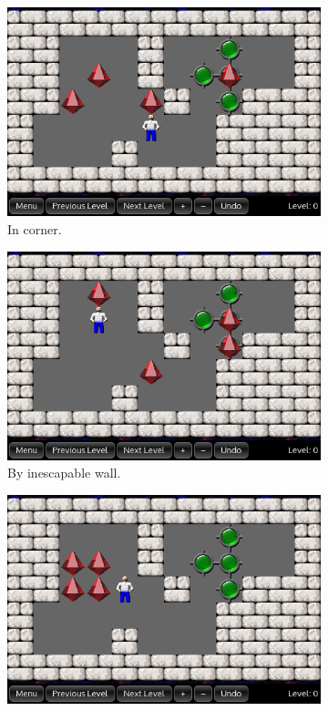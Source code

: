 \begin{figure}[h]
\centering
\begin{subfigure}{0.3\textwidth}
  \centering
  \includegraphics[width=\linewidth]{img/deadlock_corner}
  \caption{In corner.}
  \label{fig:deadlock_corner}
\end{subfigure}
%
\begin{subfigure}{0.3\textwidth}
  \centering
  \includegraphics[width=\linewidth]{img/deadlock_wall}
  \caption{By inescapable wall.}
  \label{fig:deadlock_wall}
\end{subfigure}
\begin{subfigure}{0.3\textwidth}
  \centering
  \includegraphics[width=\linewidth]{img/deadlock_diamond}

\end{subfigure}
\end{figure}
